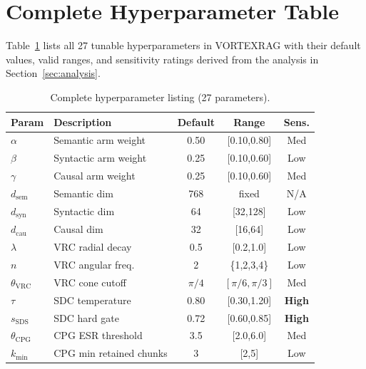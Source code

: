 \documentclass[10pt,twocolumn]{article}
\begin{document}
\appendix

\section{Complete Hyperparameter Table}\label{app:hyperparams}

Table~\ref{tab:hyperparams_full} lists all 27 tunable hyperparameters
in VORTEXRAG with their default values, valid ranges, and sensitivity ratings
derived from the analysis in Section~\ref{sec:analysis}.

\begin{table}[H]
\centering
\caption{Complete hyperparameter listing (27 parameters).}
\label{tab:hyperparams_full}
\footnotesize
\setlength{\tabcolsep}{3pt}
\begin{tabular}{@{}llccc@{}}
\toprule
\textbf{Param} & \textbf{Description} & \textbf{Default} & \textbf{Range} & \textbf{Sens.} \\
\midrule
$\alpha$          & Semantic arm weight      & 0.50 & [0.10,0.80] & Med \\
$\beta$           & Syntactic arm weight     & 0.25 & [0.10,0.60] & Low \\
$\gamma$          & Causal arm weight        & 0.25 & [0.10,0.60] & Med \\
$d_\text{sem}$    & Semantic dim             & 768  & fixed       & N/A \\
$d_\text{syn}$    & Syntactic dim            & 64   & [32,128]    & Low \\
$d_\text{cau}$    & Causal dim               & 32   & [16,64]     & Low \\
$\lambda$         & VRC radial decay         & 0.5  & [0.2,1.0]   & Low \\
$n$               & VRC angular freq.        & 2    & \{1,2,3,4\} & Low \\
$\theta_\text{VRC}$& VRC cone cutoff         & $\pi/4$ & $[\pi/6,\pi/3]$ & Med \\
$\tau$            & SDC temperature          & 0.80 & [0.30,1.20] & \textbf{High} \\
$s_\text{SDS}$    & SDC hard gate            & 0.72 & [0.60,0.85] & \textbf{High} \\
$\theta_\text{CPG}$& CPG ESR threshold       & 3.5  & [2.0,6.0]   & Med \\
$k_\text{min}$    & CPG min retained chunks  & 3    & [2,5]       & Low \\

\end{tabular}
\end{table}
\end{document}
